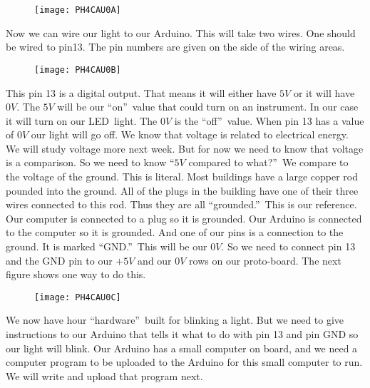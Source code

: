 \begin{figure}[h!]
	\centering
	\texttt{[image: PH4CAU0A]}
\end{figure}

Now we can wire our light to our Arduino. This will take two wires. One
should be wired to pin13. The pin numbers are given on the side of the
wiring areas. 

\begin{figure}[h!]
	\centering
	\texttt{[image: PH4CAU0B]}
\end{figure}

This pin 13 is a digital output.
That means it will either have $5\unit{V}$ or it will have $0\unit{V}.$ The $%
5\unit{V}$ will be our \textquotedblleft on\textquotedblright\ value that
could turn on an instrument. In our case it will turn on our LED\ light. The 
$0\unit{V}$ is the \textquotedblleft off\textquotedblright\ value. When pin
13 has a value of $0\unit{V}$ our light will go off. We know that voltage is
related to electrical energy. We will study voltage more next week. But for
now we need to know that voltage is a comparison. So we need to know
\textquotedblleft $5\unit{V}$ compared to what?\textquotedblright\ We
compare to the voltage of the ground. This is literal. Most buildings have a
large copper rod pounded into the ground. All of the plugs in the building
have one of their three wires connected to this rod. Thus they are all
\textquotedblleft grounded.\textquotedblright\ This is our reference. Our
computer is connected to a plug so it is grounded. Our Arduino is connected
to the computer so it is grounded. And one of our pins is a connection to
the ground. It is marked \textquotedblleft GND.\textquotedblright\ This will
be our $0\unit{V}.$ So we need to connect pin 13 and the GND pin to our $+5%
\unit{V}$ and our $0\unit{V}$ rows on our proto-board. The next figure shows
one way to do this.

\begin{figure}[h!]
	\centering
	\texttt{[image: PH4CAU0C]}
\end{figure}

We now have hour \textquotedblleft hardware\textquotedblright\ built for
blinking a light. But we need to give instructions to our Arduino that tells
it what to do with pin 13 and pin GND so our light will blink. Our Arduino
has a small computer on board, and we need a computer program to be uploaded
to the Arduino for this small computer to run. We will write and upload that
program next.

